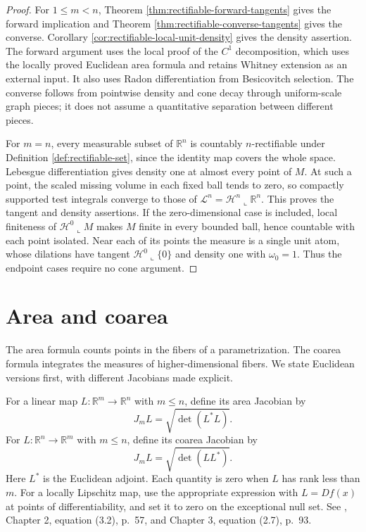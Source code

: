 \begin{proof}
For $1\leq m<n$, Theorem \ref{thm:rectifiable-forward-tangents} gives the forward implication and Theorem \ref{thm:rectifiable-converse-tangents} gives the converse. Corollary \ref{cor:rectifiable-local-unit-density} gives the density assertion. The forward argument uses the local proof of the $C^1$ decomposition, which uses the locally proved Euclidean area formula and retains Whitney extension as an external input. It also uses Radon differentiation from Besicovitch selection. The converse follows from pointwise density and cone decay through uniform-scale graph pieces; it does not assume a quantitative separation between different pieces.

For $m=n$, every measurable subset of $\mathbb R^n$ is countably $n$-rectifiable under Definition \ref{def:rectifiable-set}, since the identity map covers the whole space. Lebesgue differentiation gives density one at almost every point of $M$. At such a point, the scaled missing volume in each fixed ball tends to zero, so compactly supported test integrals converge to those of $\mathcal L^n=\mathcal H^n\llcorner\mathbb R^n$. This proves the tangent and density assertions. If the zero-dimensional case is included, local finiteness of $\mathcal H^0\llcorner M$ makes $M$ finite in every bounded ball, hence countable with each point isolated. Near each of its points the measure is a single unit atom, whose dilations have tangent $\mathcal H^0\llcorner\{0\}$ and density one with $\omega_0=1$. Thus the endpoint cases require no cone argument.
\end{proof}

\chapter{Area and coarea}\label{sec:area-coarea}
The area formula counts points in the fibers of a parametrization. The coarea formula integrates the measures of higher-dimensional fibers. We state Euclidean versions first, with different Jacobians made explicit.

\begin{definition}\label{def:jacobians}
For a linear map $L:\mathbb{R}^m\to\mathbb{R}^n$ with $m\leq n$, define its area Jacobian by
\[
 J_mL=\sqrt{\det(L^*L)}.
\]
For $L:\mathbb{R}^n\to\mathbb{R}^m$ with $m\leq n$, define its coarea Jacobian by
\[
 J_mL=\sqrt{\det(LL^*)}.
\]
Here $L^*$ is the Euclidean adjoint. Each quantity is zero when $L$ has rank less than $m$. For a locally Lipschitz map, use the appropriate expression with $L=Df(x)$ at points of differentiability, and set it to zero on the exceptional null set. See \cite{Sim18}, Chapter 2, equation (3.2), p.~57, and Chapter 3, equation (2.7), p.~93.
\end{definition}

